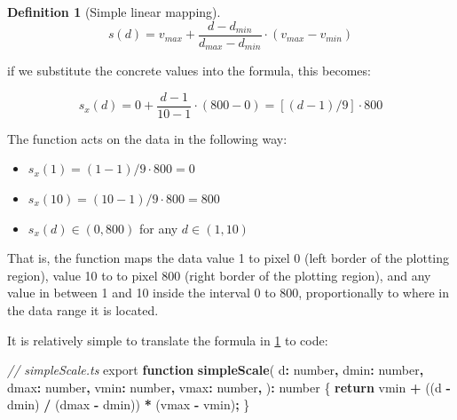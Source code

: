 \documentclass[
]{book}
\newenvironment{Shaded}{\begin{snugshade}}{\end{snugshade}}
\newcommand{\CommentTok}[1]{\textcolor[rgb]{0.56,0.35,0.01}{\textit{#1}}}
\newcommand{\ControlFlowTok}[1]{\textcolor[rgb]{0.13,0.29,0.53}{\textbf{#1}}}
\newcommand{\DataTypeTok}[1]{\textcolor[rgb]{0.13,0.29,0.53}{#1}}
\newcommand{\FunctionTok}[1]{\textcolor[rgb]{0.13,0.29,0.53}{\textbf{#1}}}
\newcommand{\ImportTok}[1]{#1}
\newcommand{\KeywordTok}[1]{\textcolor[rgb]{0.13,0.29,0.53}{\textbf{#1}}}
\newcommand{\NormalTok}[1]{#1}
\newcommand{\OperatorTok}[1]{\textcolor[rgb]{0.81,0.36,0.00}{\textbf{#1}}}
\providecommand{\tightlist}{%
  \setlength{\itemsep}{0pt}\setlength{\parskip}{0pt}}
\theoremstyle{definition}
\newtheorem{definition}{Definition}[chapter]
\theoremstyle{definition}
\theoremstyle{definition}
\theoremstyle{definition}
\theoremstyle{remark}
\begin{document}
\begin{definition}[Simple linear mapping]
\protect\hypertarget{def:linear-mapping}{}\label{def:linear-mapping}\[s(d) = v_{max} + \frac{d - d_{min}}{d_{max} - d_{min}} \cdot (v_{max} - v_{min})\]
\end{definition}

if we substitute the concrete values into the formula, this becomes:

\[s_x(d) = 0 + \frac{d - 1}{10 - 1} \cdot (800 - 0) = [(d - 1) / 9] \cdot 800\]

The function acts on the data in the following way:

\begin{itemize}
\tightlist
\item
  \(s_x(1) = (1 - 1) / 9 \cdot 800 = 0\)
\item
  \(s_x(10) = (10 - 1) / 9 \cdot 800 = 800\)
\item
  \(s_x(d) \in (0, 800)\) for any \(d \in (1, 10)\)
\end{itemize}

That is, the function maps the data value 1 to pixel 0 (left border of the plotting region), value 10 to to pixel 800 (right border of the plotting region), and any value in between 1 and 10 inside the interval 0 to 800, proportionally to where in the data range it is located.

It is relatively simple to translate the formula in \ref{def:linear-mapping} to code:

\begin{Shaded}
\begin{Highlighting}[]
\CommentTok{// simpleScale.ts}
\ImportTok{export} \KeywordTok{function} \FunctionTok{simpleScale}\NormalTok{(}
\NormalTok{  d}\OperatorTok{:} \DataTypeTok{number}\OperatorTok{,}
\NormalTok{  dmin}\OperatorTok{:} \DataTypeTok{number}\OperatorTok{,}
\NormalTok{  dmax}\OperatorTok{:} \DataTypeTok{number}\OperatorTok{,}
\NormalTok{  vmin}\OperatorTok{:} \DataTypeTok{number}\OperatorTok{,}
\NormalTok{  vmax}\OperatorTok{:} \DataTypeTok{number}\OperatorTok{,}
\NormalTok{)}\OperatorTok{:} \DataTypeTok{number}\NormalTok{ \{}
  \ControlFlowTok{return}\NormalTok{ vmin }\OperatorTok{+}\NormalTok{ ((d }\OperatorTok{{-}}\NormalTok{ dmin) }\OperatorTok{/}\NormalTok{ (dmax }\OperatorTok{{-}}\NormalTok{ dmin)) }\OperatorTok{*}\NormalTok{ (vmax }\OperatorTok{{-}}\NormalTok{ vmin)}\OperatorTok{;}
\NormalTok{\}}
\end{Highlighting}
\end{Shaded}
\end{document}
